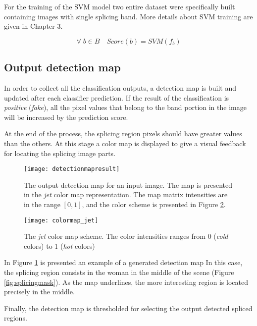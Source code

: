 For the training of the SVM model two entire dataset were specifically built containing images with single splicing band. More details about SVM training are given in Chapter 3. 

$$
\forall \; b \in B \quad Score(b) = SVM(f_b)
$$

\subsection{Output detection map}

In order to collect all the classification outputs, a detection map is built and updated after each classifier prediction. If the result of the classification is \emph{positive} (\emph{fake}), all the pixel values that belong to the band portion in the image will be increased by the prediction score.

At the end of the process, the splicing region pixels should have greater values than the others. At this stage a color map is displayed to give a visual feedback for locating the splicing image parts.

\begin{figure}[h!]
  \centering
    \texttt{[image: detectionmapresult]}
    \caption{The output detection map for an input image. The map is presented in the \emph{jet} color map representation. The map matrix intensities are in the range $[0, 1]$, and the color scheme is presented in Figure \ref{fig:colormapjet}.}
    \label{fig:regionsdetectionmap}
\end{figure}

\begin{figure}[h!]
  \centering
    \texttt{[image: colormap\_jet]}
    \caption{The \emph{jet} color map scheme. The color intensities ranges from 0 (\emph{cold} colors) to 1 (\emph{hot} colors)}
    \label{fig:colormapjet}
\end{figure}

In Figure \ref{fig:regionsdetectionmap} is presented an example of a generated detection map In this case, the splicing region consists in the woman in the middle of the scene (Figure \ref{fig:splicingmask}). As the map underlines, the more interesting region is located precisely in the middle.

Finally, the detection map is thresholded for selecting the output detected spliced regions.



